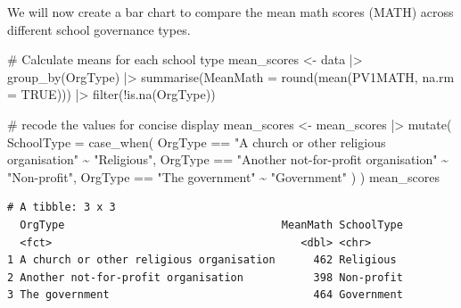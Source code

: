 \documentclass[
  letterpaper,
  DIV=11,
  numbers=noendperiod]{scrreprt}
\newenvironment{Shaded}{\begin{snugshade}}{\end{snugshade}}
\newcommand{\AttributeTok}[1]{\textcolor[rgb]{0.40,0.45,0.13}{#1}}
\newcommand{\CommentTok}[1]{\textcolor[rgb]{0.37,0.37,0.37}{#1}}
\newcommand{\ConstantTok}[1]{\textcolor[rgb]{0.56,0.35,0.01}{#1}}
\newcommand{\FunctionTok}[1]{\textcolor[rgb]{0.28,0.35,0.67}{#1}}
\newcommand{\NormalTok}[1]{\textcolor[rgb]{0.00,0.23,0.31}{#1}}
\newcommand{\OtherTok}[1]{\textcolor[rgb]{0.00,0.23,0.31}{#1}}
\newcommand{\SpecialCharTok}[1]{\textcolor[rgb]{0.37,0.37,0.37}{#1}}
\newcommand{\StringTok}[1]{\textcolor[rgb]{0.13,0.47,0.30}{#1}}
\begin{document}

We will now create a bar chart to compare the mean math scores (MATH)
across different school governance types.

\begin{Shaded}
\begin{Highlighting}[]
\CommentTok{\# Calculate means for each school type }
\NormalTok{mean\_scores }\OtherTok{\textless{}{-}}\NormalTok{ data }\SpecialCharTok{|\textgreater{}} 
  \FunctionTok{group\_by}\NormalTok{(OrgType) }\SpecialCharTok{|\textgreater{}} 
  \FunctionTok{summarise}\NormalTok{(}\AttributeTok{MeanMath =} \FunctionTok{round}\NormalTok{(}\FunctionTok{mean}\NormalTok{(PV1MATH, }\AttributeTok{na.rm =} \ConstantTok{TRUE}\NormalTok{))) }\SpecialCharTok{|\textgreater{}} 
  \FunctionTok{filter}\NormalTok{(}\SpecialCharTok{!}\FunctionTok{is.na}\NormalTok{(OrgType)) }
 
\CommentTok{\# recode the values for concise display }
\NormalTok{mean\_scores }\OtherTok{\textless{}{-}}\NormalTok{ mean\_scores }\SpecialCharTok{|\textgreater{}} 
  \FunctionTok{mutate}\NormalTok{( }
    \AttributeTok{SchoolType =} \FunctionTok{case\_when}\NormalTok{( }
\NormalTok{      OrgType }\SpecialCharTok{==} \StringTok{"A church or other religious organisation"} \SpecialCharTok{\textasciitilde{}} \StringTok{"Religious"}\NormalTok{, }
\NormalTok{      OrgType }\SpecialCharTok{==} \StringTok{"Another not{-}for{-}profit organisation"} \SpecialCharTok{\textasciitilde{}} \StringTok{"Non{-}profit"}\NormalTok{, }
\NormalTok{      OrgType }\SpecialCharTok{==} \StringTok{"The government"} \SpecialCharTok{\textasciitilde{}} \StringTok{"Government"} 
\NormalTok{    ) }
\NormalTok{  ) }
\NormalTok{mean\_scores }
\end{Highlighting}
\end{Shaded}

\begin{verbatim}
# A tibble: 3 x 3
  OrgType                                  MeanMath SchoolType
  <fct>                                       <dbl> <chr>     
1 A church or other religious organisation      462 Religious 
2 Another not-for-profit organisation           398 Non-profit
3 The government                                464 Government
\end{verbatim}
\end{document}
